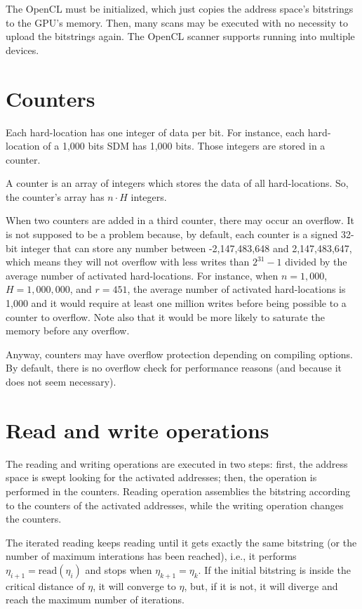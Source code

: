 The OpenCL must be initialized, which just copies the address space's bitstrings to the GPU's memory. Then, many scans may be executed with no necessity to upload the bitstrings again. The OpenCL scanner supports running into multiple devices.


\section{Counters}

Each hard-location has one integer of data per bit. For instance, each hard-location of a 1,000 bits SDM has 1,000 bits. Those integers are stored in a counter.

A counter is an array of integers which stores the data of all hard-locations. So, the counter's array has $n \cdot H$ integers.

When two counters are added in a third counter, there may occur an overflow. It is not supposed to be a problem because, by default, each counter is a signed 32-bit integer that can store any number between -2,147,483,648 and 2,147,483,647, which means they will not overflow with less writes than $2^{31}-1$ divided by the average number of activated hard-locations. For instance, when $n=1,000$, $H=1,000,000$, and $r=451$, the average number of activated hard-locations is 1,000 and it would require at least one million writes before being possible to a counter to overflow.  Note also that it would be more likely to saturate the memory before any overflow.

Anyway, counters may have overflow protection depending on compiling options. By default, there is no overflow check for performance reasons (and because it does not seem necessary).

\section{Read and write operations}

The reading and writing operations are executed in two steps: first, the address space is swept looking for the activated addresses; then, the operation is performed in the counters. Reading operation assemblies the bitstring according to the counters of the activated addresses, while the writing operation changes the counters.

The iterated reading keeps reading until it gets exactly the same bitstring (or the number of maximum interations has been reached), i.e., it performs $\eta_{i+1} = \text{read}(\eta_i)$ and stops when $\eta_{k+1} = \eta_{k}$. If the initial bitstring is inside the critical distance of $\eta$, it will converge to $\eta$, but, if it is not, it will diverge and reach the maximum number of iterations.

